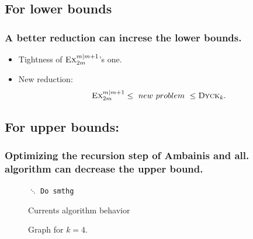 \documentclass[9pt, notheorems]{beamer}
\newcommand{\Dyck}[1]{\textsc{Dyck$_{#1}$}}
\theoremstyle{definition}
\theoremstyle{plain}
\theoremstyle{definition}
\begin{document}
\subsection{For lower bounds}
\begin{frame}
    \frametitle{A better reduction can increse the lower bounds.}
    \begin{itemize}
        \item Tightness of $\textsc{Ex}_{2m}^{m|m+1}$'s one.
        \item New reduction:
              \[\textsc{Ex}_{2m}^{m|m+1} \leq\ new\ problem\ \leq \Dyck{k}.\]
    \end{itemize}
\end{frame}

\subsection{For upper bounds:}
\begin{frame}
    \frametitle{Optimizing the recursion step of Ambainis and all. algorithm can decrease the upper bound.}
    \begin{minipage}{.45\textwidth}
        \begin{figure}
            \begin{algorithmic}
                \State $\ddots$
                \State \texttt{Do smthg}
                \EndFor
                \EndFor
                \EndFor
            \end{algorithmic}
            \caption{Currents algorithm behavior}
        \end{figure}
    \end{minipage}
    \hfill
    \begin{minipage}{.45\textwidth}
        \begin{figure}
            \caption{Graph for $k=4$.}
        \end{figure}
    \end{minipage}
\end{frame}
\end{document}
